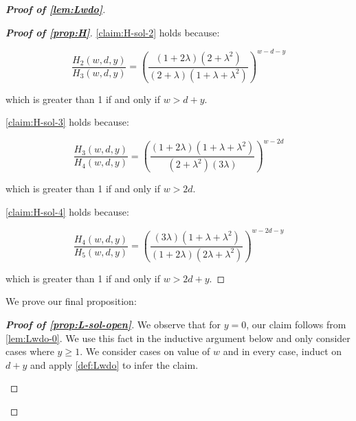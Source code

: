 \documentclass[10pt,a4paper]{article}
\newcommand{\openinteger}{y}
\begin{document}
\begin{proof}[\textbf{Proof of \cref{lem:Lwdo}}]
\begin{proof}[\textbf{Proof of \cref{prop:H}}]
\cref{claim:H-sol-2} holds because: 

\begin{equation*}
\frac{H_2(w, d, \openinteger)}{H_3(w, d, \openinteger)} = \left(\frac{(1+2\lambda)(2+\lambda^2)}{(2+\lambda)(1+\lambda+\lambda^2)}\right)^{w-d-\openinteger}
\end{equation*}

which is greater than 1 if and only if $w > d + \openinteger$.

\cref{claim:H-sol-3} holds because:

\begin{equation*}
\frac{H_3(w, d, \openinteger)}{H_4(w, d, \openinteger)} = \left(\frac{(1+2\lambda)(1+\lambda+\lambda^2)}{(2+\lambda^2)(3\lambda)}\right)^{w-2d}
\end{equation*}

which is greater than 1 if and only if $w>2d$.

\cref{claim:H-sol-4} holds because:

\begin{equation*}
\frac{H_4(w, d, \openinteger)}{H_5(w, d, \openinteger)} =\left(\frac{(3\lambda)(1+\lambda+\lambda^2)}{(1+2\lambda)(2\lambda+\lambda^2)}\right)^{w-2d-\openinteger}
\end{equation*}

which is greater than 1 if and only if $w>2d+\openinteger$.
\end{proof}

We prove our final proposition:

\begin{proof}[\textbf{Proof of \cref{prop:L-sol-open}}]
We observe that for $\openinteger = 0$, our claim follows from \cref{lem:Lwdo-0}.
We use this fact in the inductive argument below and only consider cases where $\openinteger \ge 1$. We consider cases on value of $w$ and in every case, induct on $d + \openinteger$ and apply \cref{def:Lwdo} to infer the claim.  

\begin{enumerate}[label=\textbf{Case \arabic*:}, itemindent=*, leftmargin=0em]


\end{enumerate}
\end{proof}
\end{proof}
\end{document}
